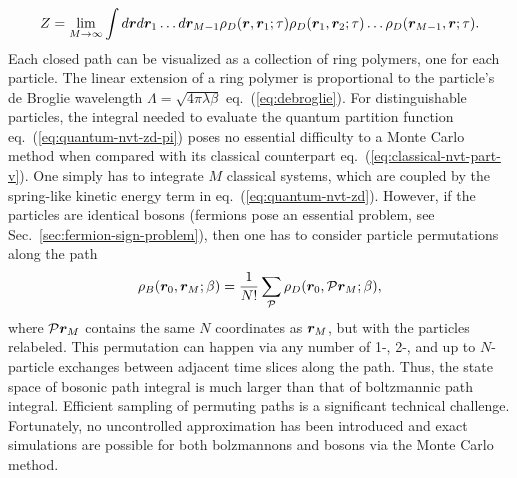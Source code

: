 \begin{align} \label{eq:quantum-nvt-zd-pi}
Z=\lim\limits_{M\rightarrow\infty} \int d\boldsymbol{r} d\boldsymbol{r}_1\dots d\boldsymbol{r}_{M-1}
\rho_D(\boldsymbol{r},\boldsymbol{r}_1;\tau)\rho_D(\boldsymbol{r}_1,\boldsymbol{r}_2;\tau)\dots\rho_D(\boldsymbol{r}_{M-1},\boldsymbol{r};\tau).
\end{align}
Each closed path can be visualized as a collection of ring polymers, one for each particle. The linear extension of a ring polymer is proportional to the particle's de Broglie wavelength $\Lambda=\sqrt{4\pi\lambda\beta}$ eq.~(\ref{eq:debroglie}).
For distinguishable particles, the integral needed to evaluate the quantum partition function eq.~(\ref{eq:quantum-nvt-zd-pi}) poses no essential difficulty to a Monte Carlo method when compared with its classical counterpart eq.~(\ref{eq:classical-nvt-part-v}). One simply has to integrate $M$ classical systems, which are coupled by the spring-like kinetic energy term in eq.~(\ref{eq:quantum-nvt-zd}).
However, if the particles are identical bosons (fermions pose an essential problem, see Sec.~\ref{sec:fermion-sign-problem}), then one has to consider particle permutations along the path
\begin{align}
\rho_B(\boldsymbol{r}_0,\boldsymbol{r}_M;\beta) = \frac{1}{N!}\sum\limits_{\mathcal{P}} \rho_D(\boldsymbol{r}_0, \mathcal{P}\boldsymbol{r}_M;\beta),
\end{align}
where $\mathcal{P}\boldsymbol{r}_M$ contains the same $N$ coordinates as $\boldsymbol{r}_M$, but with the particles relabeled. This permutation can happen via any number of 1-, 2-, and up to $N$-particle exchanges between adjacent time slices along the path. Thus, the state space of bosonic path integral is much larger than that of boltzmannic path integral. Efficient sampling of permuting paths is a significant technical challenge. Fortunately, no uncontrolled approximation has been introduced and exact simulations are possible for both bolzmannons and bosons via the Monte Carlo method.


